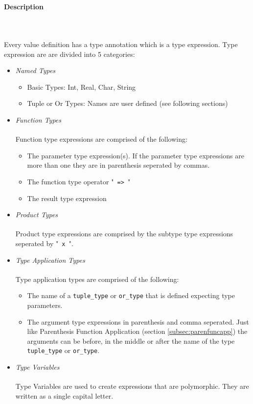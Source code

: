 \documentclass{article}
\def\pend{\mbox{} \\\\}
\begin{document}
\paragraph{Description}\pend
Every value definition has a type annotation which is a type expression. 
Type expression are are divided into 5 categories:
\begin{itemize}
\item \textit{Named Types}

  \begin{itemize}
  \item Basic Types: Int, Real, Char, String

  \item Tuple or Or Types: Names are user defined (see following sections)
  \end{itemize}

\item \textit{Function Types}\\\\
Function type expressions are comprised of the following:

  \begin{itemize}
  \item
  The parameter type expression(s). If the parameter type expressions are more than
  one they are in parenthesis seperated by commas.

  \item
  The function type operator  "\texttt{ => }"

  \item
  The result type expression
  \end{itemize}

\item \textit{Product Types}\\\\
Product type expressions are comprised by the subtype type expressions seperated
by "\texttt{ x }".

\item \textit{Type Application Types}\\\\
Type application types are comprised of the following: 

  \begin{itemize}
  \item
  The name of a \texttt{tuple_type} or \texttt{or_type} that is defined expecting
  type parameters.

  \item
  The argument type expressions in parenthesis and comma seperated. Just like
  Parenthesis Function Application (section \ref{subsec:parenfuncapp}) the 
  arguments can be before, in the middle or after the name of the type
  \texttt{tuple_type} or \texttt{or_type}.

  \end{itemize}

\item \textit{Type Variables}\\\\
Type Variables are used to create expressions that are polymorphic.
They are written as a single capital letter.

\end{itemize}
\end{document}
